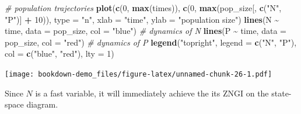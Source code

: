 \documentclass[
]{book}
\newenvironment{Shaded}{\begin{snugshade}}{\end{snugshade}}
\newcommand{\AttributeTok}[1]{\textcolor[rgb]{0.13,0.29,0.53}{#1}}
\newcommand{\CommentTok}[1]{\textcolor[rgb]{0.56,0.35,0.01}{\textit{#1}}}
\newcommand{\DecValTok}[1]{\textcolor[rgb]{0.00,0.00,0.81}{#1}}
\newcommand{\FunctionTok}[1]{\textcolor[rgb]{0.13,0.29,0.53}{\textbf{#1}}}
\newcommand{\NormalTok}[1]{#1}
\newcommand{\SpecialCharTok}[1]{\textcolor[rgb]{0.81,0.36,0.00}{\textbf{#1}}}
\newcommand{\StringTok}[1]{\textcolor[rgb]{0.31,0.60,0.02}{#1}}
\begin{document}
\begin{Shaded}
\begin{Highlighting}[]
\CommentTok{\# population trajectories}
\FunctionTok{plot}\NormalTok{(}\FunctionTok{c}\NormalTok{(}\DecValTok{0}\NormalTok{, }\FunctionTok{max}\NormalTok{(times)), }\FunctionTok{c}\NormalTok{(}\DecValTok{0}\NormalTok{, }\FunctionTok{max}\NormalTok{(pop\_size[, }\FunctionTok{c}\NormalTok{(}\StringTok{"N"}\NormalTok{, }\StringTok{"P"}\NormalTok{)] }\SpecialCharTok{+} \DecValTok{10}\NormalTok{)), }\AttributeTok{type =} \StringTok{"n"}\NormalTok{, }\AttributeTok{xlab =} \StringTok{"time"}\NormalTok{, }\AttributeTok{ylab =} \StringTok{"population size"}\NormalTok{)}
\FunctionTok{lines}\NormalTok{(N }\SpecialCharTok{\textasciitilde{}}\NormalTok{ time, }\AttributeTok{data =}\NormalTok{ pop\_size, }\AttributeTok{col =} \StringTok{"blue"}\NormalTok{) }\CommentTok{\# dynamics of N}
\FunctionTok{lines}\NormalTok{(P }\SpecialCharTok{\textasciitilde{}}\NormalTok{ time, }\AttributeTok{data =}\NormalTok{ pop\_size, }\AttributeTok{col =} \StringTok{"red"}\NormalTok{) }\CommentTok{\# dynamics of P}
\FunctionTok{legend}\NormalTok{(}\StringTok{"topright"}\NormalTok{, }\AttributeTok{legend =} \FunctionTok{c}\NormalTok{(}\StringTok{"N"}\NormalTok{, }\StringTok{"P"}\NormalTok{), }\AttributeTok{col =} \FunctionTok{c}\NormalTok{(}\StringTok{"blue"}\NormalTok{, }\StringTok{"red"}\NormalTok{), }\AttributeTok{lty =} \DecValTok{1}\NormalTok{)}
\end{Highlighting}
\end{Shaded}

\texttt{[image: bookdown-demo\_files/figure-latex/unnamed-chunk-26-1.pdf]}

Since \(N\) is a fast variable, it will immediately achieve the its ZNGI on the state-space diagram.
\end{document}
